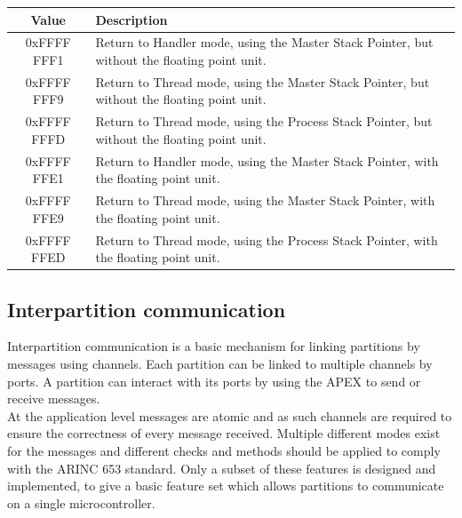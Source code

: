 \begin{table}[H]
	\centering
	\begin{tabular}{|c|p{10cm}|}
		\hline
		Value			&	Description 	\\
		\hline
		0xFFFF FFF1 	&	Return to Handler mode, using the Master Stack Pointer, but without the floating point unit.	\\
		\hline
		0xFFFF FFF9		&	Return to Thread mode, using the Master Stack Pointer, but without the floating point unit.		\\
		\hline
		0xFFFF FFFD		&	Return to Thread mode, using the Process Stack Pointer, but without the floating point unit.	\\
		\hline
		0xFFFF FFE1		&	Return to Handler mode, using the Master Stack Pointer, with the floating point unit.			\\
		\hline
		0xFFFF FFE9		&	Return to Thread mode, using the Master Stack Pointer, with the floating point unit.			\\
		\hline
		0xFFFF FFED		&	Return to Thread mode, using the Process Stack Pointer, with the floating point unit.			\\
		\hline
	\end{tabular}
	\label{tab:exc-return}
\end{table}


\subsection{Interpartition communication}
\label{design:interpart_comm}
Interpartition communication is a basic mechanism for linking partitions by messages using channels.
Each partition can be linked to multiple channels by ports.
A partition can interact with its ports by using the APEX to send or receive messages.\\

At the application level messages are atomic and as such channels are required to ensure the correctness of every message received\cite{arinc_interpartition_comm_atomic}.
Multiple different modes exist for the messages and different checks and methods should be applied to comply with the ARINC 653 standard.
Only a subset of these features is designed and implemented,
to give a basic feature set which allows partitions to communicate on a single microcontroller.\\

